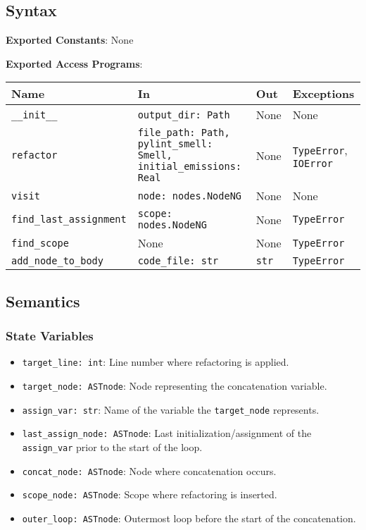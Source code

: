 \documentclass[12pt, titlepage]{article}
\begin{document}
\subsection{Syntax}
\noindent
\textbf{Exported Constants}: None

\noindent
\textbf{Exported Access Programs}:
  
\begin{tabularx}{\linewidth}{|
    l|
    >{\raggedright\arraybackslash}X|
    l|
    l|}
  \toprule Name & In & Out & Exceptions \\
  \midrule
  \texttt{\_\_init\_\_} & \texttt{output\_dir: Path} & None & None \\
  \hline
  \texttt{refactor} & \texttt{file\_path: Path, pylint\_smell: Smell, initial\_emissions: Real} & None & \texttt{TypeError}, \texttt{IOError} \\
  \hline
  \texttt{visit} & \texttt{node: nodes.NodeNG} & None & None \\
  \hline
  \texttt{find\_last\_assignment} & \texttt{scope: nodes.NodeNG} & None & \texttt{TypeError} \\
  \hline
  \texttt{find\_scope} & None & None & \texttt{TypeError} \\
  \hline
  \texttt{add\_node\_to\_body} & \texttt{code\_file: str} & \texttt{str} & \texttt{TypeError} \\
  \bottomrule
\end{tabularx}
  
\subsection{Semantics}
  
\subsubsection{State Variables}
\begin{itemize}
  \item \texttt{target\_line: int}: Line number where refactoring is applied.
  \item \texttt{target\_node: ASTnode}: Node representing the concatenation variable.
  \item \texttt{assign\_var: str}: Name of the variable the \texttt{target\_node} represents.
  \item \texttt{last\_assign\_node: ASTnode}: Last initialization/assignment of the \texttt{assign\_var} prior to the start of the loop.
  \item \texttt{concat\_node: ASTnode}: Node where concatenation occurs.
  \item \texttt{scope\_node: ASTnode}: Scope where refactoring is inserted.
  \item \texttt{outer\_loop: ASTnode}: Outermost loop before the start of the concatenation.
\end{itemize}
  
\end{document}
